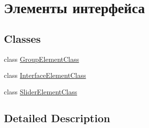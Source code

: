 \hypertarget{group___interface_elements}{}\section{Элементы интерфейса}
\label{group___interface_elements}
\subsection*{Classes}
\begin{DoxyCompactItemize}
\item 
class \hyperlink{class_group_element_class}{Group\+Element\+Class}
\item 
class \hyperlink{class_interface_element_class}{Interface\+Element\+Class}
\item 
class \hyperlink{class_slider_element_class}{Slider\+Element\+Class}
\end{DoxyCompactItemize}


\subsection{Detailed Description}

